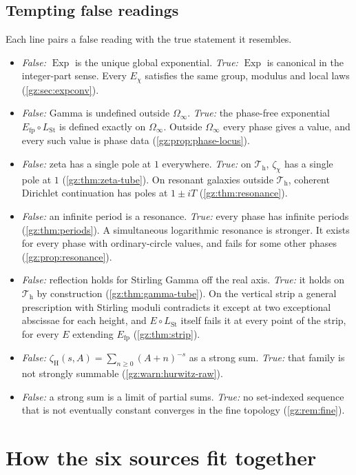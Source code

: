 \documentclass[11pt,a4paper]{article}
\numberwithin{equation}{section}
\theoremstyle{definition}
\theoremstyle{remark}
\newcommand{\Exp}{\operatorname{Exp}}
\newcommand{\Efp}{E_{\mathrm{fp}}}
\newcommand{\LSt}{L_{\mathrm{St}}}
\newcommand{\zH}{\zeta_{\mathrm H}}
\newcommand{\Th}{\mathcal T_{\mathrm h}}
\newcommand{\Om}{\Omega_{\infty}}
\begin{document}
\subsection{Tempting false readings}\label{gz:sec:false}
Each line pairs a false reading with the true statement it resembles.
\begin{itemize}
\item \emph{False:} $\Exp$ is the unique global exponential. \emph{True:}
 $\Exp$ is canonical in the integer-part sense. Every $E_\chi$ satisfies the
 same group, modulus and local laws (\cref{gz:sec:expconv}).
\item \emph{False:} Gamma is undefined outside $\Om$. \emph{True:} the
 phase-free exponential $\Efp\circ\LSt$ is defined exactly on $\Om$.
 Outside $\Om$ every phase gives a value, and every such value is phase
 data (\cref{gz:prop:phase-locus}).
\item \emph{False:} zeta has a single pole at $1$ everywhere. \emph{True:}
 on $\Th$, $\zeta_\chi$ has a single pole at $1$ (\cref{gz:thm:zeta-tube}).
 On resonant galaxies outside $\Th$, coherent Dirichlet continuation has
 poles at $1\pm iT$ (\cref{gz:thm:resonance}).
\item \emph{False:} an infinite period is a resonance. \emph{True:} every
 phase has infinite periods (\cref{gz:thm:periods}). A simultaneous
 logarithmic resonance is stronger. It exists for every phase with
 ordinary-circle values, and fails for some other phases
 (\cref{gz:prop:resonance}).
\item \emph{False:} reflection holds for Stirling Gamma off the real axis.
 \emph{True:} it holds on $\Th$ by construction (\cref{gz:thm:gamma-tube}).
 On the vertical strip a general prescription with Stirling moduli
 contradicts it except at two exceptional abscissae for each height, and
 $E\circ\LSt$ itself fails it at every point of the strip, for every $E$
 extending $\Efp$ (\cref{gz:thm:strip}).
\item \emph{False:} $\zH(s,A)=\sum_{n\ge0}(A+n)^{-s}$ as a strong sum.
 \emph{True:} that family is not strongly summable (\cref{gz:warn:hurwitz-raw}).
\item \emph{False:} a strong sum is a limit of partial sums. \emph{True:}
 no set-indexed sequence that is not eventually constant converges in the
 fine topology (\cref{gz:rem:fine}).
\end{itemize}

\section{How the six sources fit together}\label{gz:sec:fit}
\end{document}
